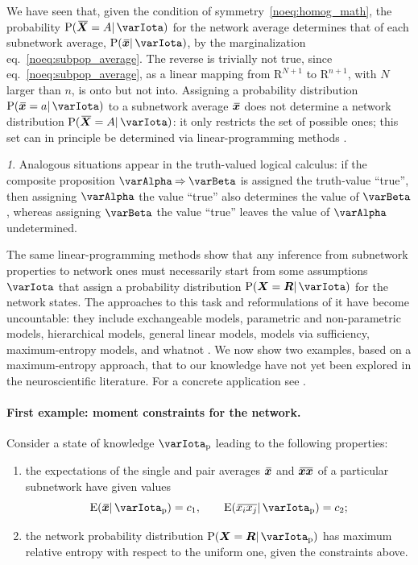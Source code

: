 \documentclass{article}
\theoremstyle{remark}
\theoremstyle{innote}
\newtheorem*{innote}{}
\newcommand*{\citep}{\parencites}
\newcommand*{\RR}{\bm{\mathrm{R}}}
\newcommand*{\limplies}{\mathbin{\Rightarrow}}%
\renewcommand*{\|}{\mathpunct{|}}%
\newcommand*{\p}{\mathrm{P}}%
\newcommand*{\eqn}{eq.}%
\newcommand*{\eg}{{e.g.}}
\newcommand*{\E}{\mathrm{E}}
\DeclarePairedDelimiter\expp{(}{)}
\newcommand*{\expe}{\E\expp}%
\theoremstyle{simple}
\newcommand*{\widebar}[1]{{\mkern1.5mu\skew{2}\overline{\mkern-1.5mu#1\mkern-1.5mu}\mkern 1.5mu}}
\newcommand*{\av}{\widebar} %
\newcommand*{\sav}{\widebar} %
\newcommand*{\yxx}{x}%
\newcommand*{\yx}{\bm{\yxx}}%
\newcommand*{\yxs}{\sav{\yx}}%
\newcommand*{\yX}{\bm{X}}%
\newcommand*{\yXf}{\av{\yX}}%
\newcommand*{\yR}{\bm{R}}%
\newcommand*{\yH}{\varIota}
\newcommand*{\yHa}{\varIota_\textrm{p}}
\begin{document}
We have seen that, given the condition of symmetry~\eqref{noeq:homog_math},
the probability $\p(\yXf = A \|\yH)$ for the network average determines
that of each subnetwork average, $\p(\yxs \|\yH)$, by the
marginalization \eqn~\eqref{noeq:subpop_average}. The reverse is trivially
not true, since \eqn~\eqref{noeq:subpop_average}, as a linear mapping from
$\RR^{N+1}$ to $\RR^{n+1}$, with $N$ larger than $n$, is onto but not into.
Assigning a probability distribution $\p(\yxs = a \|\yH)$ to a
subnetwork average $\yxs$ does not determine a network distribution
$\p(\yXf = A\|\yH)$: it only restricts the set of possible ones; this
set can in principle be determined via linear-programming methods
\citep{hailperin1965,hailperin1984,hailperin1996,hailperin2006,hailperin2011}.
\begin{innote}
  Analogous situations appear in the truth-valued logical calculus: if the
  composite proposition $\varAlpha\limplies \varBeta$ is assigned the
  truth-value \enquote{true}, then assigning $\varAlpha$ the value
  \enquote{true} also determines the value of $\varBeta$, whereas assigning
  $\varBeta$ the value \enquote{true} leaves the value of $\varAlpha$
  undetermined.
\end{innote}
The same linear-programming methods show that any inference from subnetwork
properties to network ones must necessarily start from some assumptions
$\varIota$ that assign a probability distribution
$\p(\yX = \yR \| \varIota)$ for the network states. The approaches to
this task and reformulations of it have become uncountable: they include
exchangeable models, parametric and non-parametric models, hierarchical
models, general linear models, models via sufficiency, maximum-entropy
models, and whatnot
\citep[\eg:][]{jeffreys1931_r1973,jeffreys1939_r2003,jaynes1994_r2003,bernardoetal1994,gelmanetal1995_r2014,ghoshetal1997,kallenberg2005,gregory2005,sivia1996_r2006,ferreiraetal2007,dawid2013,damienetal2013}.
We now show two examples, based on a maximum-entropy approach, that to our
knowledge have not yet been explored in the neuroscientific literature. For
a concrete application see \citep{rostamietal2016b}.



\paragraph{First example: moment constraints for the network.}
\label{nosec:maxent_moments}
Consider a state of knowledge $\yHa$ leading to the following properties:
\begin{enumerate}%
\item the expectations of the single and pair averages $\yxs$ and
  $\sav{\yx\yx}$ of a particular subnetwork have given values
  \begin{equation}
    \label{noeq:constr_ex1}
    \expe{\yxs \| \yHa} = c_1, \qquad \expe{\sav{x_i x_j}\|\yHa} = c_2;
  \end{equation}
\item the network probability distribution $\p(\yX = \yR \|\yHa)$
  has maximum relative entropy with respect to the uniform one, given the
  constraints above.
\end{enumerate}
\end{document}
